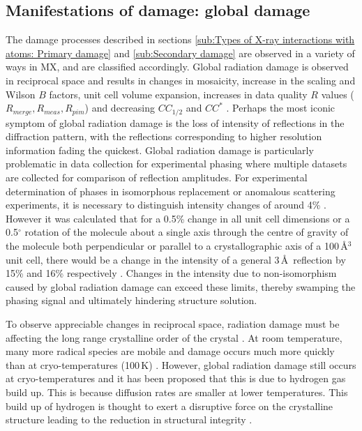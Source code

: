    \subsection{Manifestations of damage: global damage}
    \label{sub:Manifestations of damage: Global damage}
        The damage processes described in sections \ref{sub:Types of X-ray interactions with atoms: Primary damage} and \ref{sub:Secondary damage} are observed in a variety of ways in MX, and are classified accordingly.
        Global radiation damage is observed in reciprocal space and results in changes in mosaicity, increase in the scaling and Wilson $B$ factors, unit cell volume expansion, increases in data quality $R$ values ($R_{merge}, R_{meas}, R_{pim}$) and decreasing $CC_{1/2}$ and $CC^*$ \cite{garman2010}.
        Perhaps the most iconic symptom of global radiation damage is the loss of intensity of reflections in the diffraction pattern, with the reflections corresponding to higher resolution information fading the quickest.
        Global radiation damage is particularly problematic in data collection for experimental phasing where multiple datasets are collected for comparison of reflection amplitudes.
        For experimental determination of phases in isomorphous replacement or anomalous scattering experiments, it is necessary to distinguish intensity changes of around 4\% \cite{taylor2010}.
        However it was calculated that for a 0.5\% change in all unit cell dimensions or a 0.5$^{\circ}$ rotation of the molecule about a single axis through the centre of gravity of the molecule both perpendicular or parallel to a crystallographic axis of a 100\,\AA$^3$ unit cell, there would be a change in the intensity of a general 3\,\AA\ reflection by 15\% and 16\% respectively \cite{crick1956}.
        Changes in the intensity due to non-isomorphism caused by global radiation damage can exceed these limits, thereby swamping the phasing signal and ultimately hindering structure solution.

        To observe appreciable changes in reciprocal space, radiation damage must be affecting the long range crystalline order of the crystal \cite{meents2010}.
        At room temperature, many more radical species are mobile and damage occurs much more quickly than at cryo-temperatures (100\,K) \cite{henderson1990cryo,nave2005,weik2010temperature}.
        However, global radiation damage still occurs at cryo-temperatures and it has been proposed that this is due to hydrogen gas build up.
		This is because diffusion rates are smaller at lower temperatures.
		This build up of hydrogen is thought to exert a disruptive force on the crystalline structure leading to the reduction in structural integrity \cite{meents2010}.


